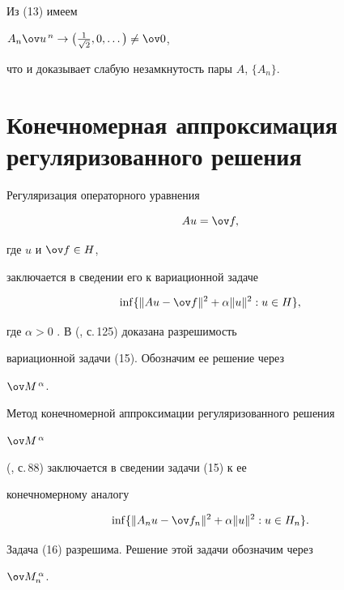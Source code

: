 Из (13) имеем 


$A_n\ov u^{\,n}\to\big(\frac{1}{\sqrt{2}},0,\dotsc\big)\ne\ov 0$, 


что и доказывает слабую незамкнутость пары $A$, $\{A_n\}$. 


 


\section{Конечномерная аппроксимация регуляризованного решения} 


 


Регуляризация операторного уравнения 


\begin{equation} 


Au=\ov f,


\end{equation} 


где $u$ и $\ov f\in H$, 


заключается в сведении его к вариационной задаче 


\begin{equation} 


\inf\{\|Au-\ov f\|^2+\alpha\|u\|^2:u\in H\}, 


\end{equation} 


где $\alpha>0$ \cite{1}. В (\cite{3}, с.\,125) доказана разрешимость 


вариационной задачи (15). Обозначим ее решение через 


$\ov M^{\,\alpha}$. 


 


Метод конечномерной аппроксимации регуляризованного решения 


$\ov M^{\,\alpha}$ 


(\cite{3}, с.\,88) заключается в сведении задачи (15) к ее 


конечномерному аналогу 


\begin{equation} 


\inf\{\|A_nu-\ov f_n\|^2+\alpha\|u\|^2:u\in H_n\}. 


\end{equation} 


Задача (16) разрешима. Решение этой задачи обозначим через 


$\ov M^{\,\alpha}_n$. 


